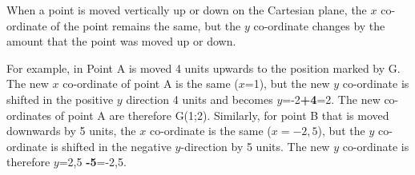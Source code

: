         \label{m39358*id70438}When a point is moved vertically up or down on the Cartesian plane, the $x$ co-ordinate of the point remains the same, but the \begin{math}y\end{math} co-ordinate changes by the amount that the point was moved up or down.\par 
        \label{m39358*id70461}For example, in  Point A is moved 4 units upwards to the position marked by G. The new $x$ co-ordinate of point A is the same (\begin{math}x\end{math}=1), but the new \begin{math}y\end{math} co-ordinate is shifted in the positive \begin{math}y\end{math} direction 4 units and becomes \begin{math}y\end{math}=-2\textbf{+4}=2. The new co-ordinates of point A are therefore G(1;2). Similarly, for point B that is moved downwards by 5 units, the \begin{math}x\end{math} co-ordinate is the same (\begin{math}x=-2,5\end{math}), but the \begin{math}y\end{math} co-ordinate is shifted in the negative \begin{math}y\end{math}-direction by 5 units. The new \begin{math}y\end{math} co-ordinate is therefore \begin{math}y\end{math}=2,5 \textbf{-5}=-2,5.\par 
        
    \setcounter{subfigure}{0}


